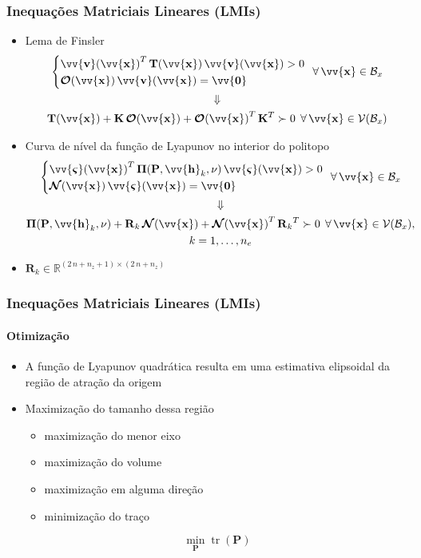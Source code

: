\documentclass{beamer}
\DeclareMathOperator{\trace}{tr}
\newcommand*{\Round}[1]{\left(#1\right)}
\newcommand*{\Prod}{\,}
\newcommand*{\Bold}[1]{\boldsymbol{\mathbf{#1}}}
\newcommand*{\Matr}[1]{\Bold{#1}}
\newcommand*{\Vect}[1]{\vv{\Bold{#1}}}
\newcommand*{\Transp}[1]{{#1}^{T}}
\newcommand*{\Trace}[1]{\trace\Round{#1}}
\newcommand*{\ForAll}{\:\:\forall\,}
\newcommand*{\Vimplies}{\\\Downarrow\\}
\renewcommand{\Prod}{\,}
\begin{document}
\begin{frame}\frametitle{Inequações Matriciais Lineares (LMIs)}
  \begin{itemize}
    \item Lema de Finsler
    \begin{gather}
      \left\{\begin{aligned}
        &\Transp{\Vect{v}(\Vect{x})} \Prod \Matr{T}(\Vect{x}) \Prod \Vect{v}(\Vect{x}) > 0
        \\
        &\Matr{\mathcal{O}}(\Vect{x}) \Prod \Vect{v}(\Vect{x}) = \Vect{0}
      \end{aligned}\right.
      \ForAll \Vect{x} \in \mathcal{B}_x
      \Vimplies
      \Matr{T}(\Vect{x}) + \Matr{K} \Prod \Matr{\mathcal{O}}(\Vect{x}) + \Transp{\Matr{\mathcal{O}}(\Vect{x})} \Prod \Transp{\Matr{K}} \succ 0
      \ForAll \Vect{x} \in \mathcal{V}(\mathcal{B}_x)
    \end{gather}
    \item Curva de nível da função de Lyapunov no interior do politopo
    \begin{gather}
      \left\{\begin{aligned}
        &\Transp{\Vect{\varsigma}(\Vect{x})} \Prod \Matr{\Pi}(\Matr{P}, \Vect{h}_k, \nu) \Prod \Vect{\varsigma}(\Vect{x}) > 0
        \\
        &\Matr{\mathcal{N}}(\Vect{x}) \Prod \Vect{\varsigma}(\Vect{x}) = \Vect{0}
      \end{aligned}\right.
      \ForAll \Vect{x} \in \mathcal{B}_x
      \Vimplies
      \Matr{\Pi}(\Matr{P}, \Vect{h}_k, \nu) + \Matr{R}_k \Prod \Matr{\mathcal{N}}(\Vect{x}) + \Transp{\Matr{\mathcal{N}}(\Vect{x})} \Prod \Transp{\Matr{R}_k} \succ 0
      \ForAll \Vect{x} \in \mathcal{V}(\mathcal{B}_x)
      ,\\ k = 1, \dotsc, n_e
    \end{gather}
    \item $\Matr{R}_k \in \mathbb{R}^{(2 \Prod n + n_z + 1) \times (2 \Prod n + n_z)}$
  \end{itemize}
\end{frame}

\begin{frame}\frametitle{Inequações Matriciais Lineares (LMIs)}\framesubtitle{Otimização}
  \begin{itemize}
    \item A função de Lyapunov quadrática resulta em uma estimativa elipsoidal da região de atração da origem
    \item Maximização do tamanho dessa região
    \begin{itemize}
      \item maximização do menor eixo
      \item maximização do volume
      \item maximização em alguma direção
      \item minimização do traço
    \end{itemize}
    \begin{equation}
      \min_{\Matr{P}} \Trace{\Matr{P}}
    \end{equation}
  \end{itemize}
\end{frame}
\end{document}
